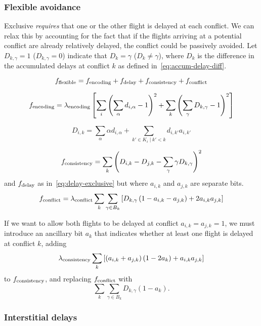 \subsubsection{Flexible avoidance}
Exclusive \emph{requires} that one or the other flight is delayed at each conflict.
We can relax this by accounting for the fact that if the flights arriving at a potential conflict are already relatively delayed, the conflict could be passively avoided.
Let $D_{k, \gamma} = 1$ ($D_{k, \gamma} = 0$) indicate that $D_k = \gamma$ ($D_k \neq \gamma$), where $D_k$ is the difference in the accumulated delays at conflict $k$ as defined in~\eqref{eq:accum-delay-diff}.

\begin{equation}
f_{\mathrm{flexible}}
=
f_{\mathrm{encoding}} +
f_{\mathrm{delay}} +
f_{\mathrm{consistency}} + 
f_{\mathrm{conflict}}
\end{equation}
\begin{widetext}
\begin{equation}
f_{\mathrm{encoding}}
=
\lambda_{\mathrm{encoding}}
\left[
  \sum_i {\left(\sum_{\alpha} d_{i, \alpha} - 1\right)}^2
  +
  \sum_{k}
  {\left(\sum_{\gamma} D_{k, \gamma} - 1\right)}^2
\right]
\end{equation}

\begin{equation}
D_{i, k} = \sum_{\alpha} \alpha d_{i, \alpha} +
\sum_{\left. k' \in K_i \middle| k' < k\right.}
d_{i, k'} a_{i, k'}
\end{equation}

\begin{equation}
f_{\mathrm{consistency}}
=
\sum_k
{\left( 
D_{i, k} - D_{j, k}
-
\sum_{\gamma} \gamma D_{k, \gamma}
\right)}^2
\end{equation}
and $f_{\mathrm{delay}}$ as in~\eqref{eq:delay-exclusive} but where $a_{i,k}$ and $a_{j, k}$ are separate bits.
\begin{equation}
f_{\mathrm{conflict}}
=
\lambda_{\mathrm{conflict}}
\sum_k \sum_{\gamma \in B_k} 
\left[
D_{k, \gamma}
\left(1 - a_{i, k} - a_{j, k}\right)
+ 2 a_{i, k} a_{j, k}
\right]
\end{equation}
\end{widetext}

If we want to allow both flights to be delayed at conflict $a_{i,k} = a_{j, k} = 1$, we must introduce an ancillary bit $a_k$ that indicates whether at least one flight is delayed at conflict $k$, adding
\begin{equation}
  \lambda_{\mathrm{consistency}}
  \sum_{k} 
  \left[
    \left(a_{i, k} + a_{j, k} \right) \left(1 - 2 a_k\right)
    + a_{i, k} a_{j, k}
  \right]
\end{equation}
to $f_{\mathrm{consistency}}$, and
replacing $f_{\mathrm{conflict}}$ with
\begin{equation}
\sum_k \sum_{\gamma \in B_k} D_{k, \gamma} (1 - a_k).
\end{equation}

\subsubsection{Interstitial delays}

